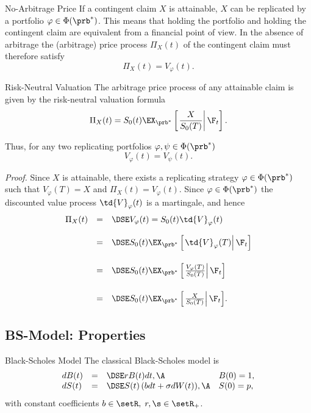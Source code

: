 No-Arbitrage Price
	If a contingent claim $X$ is attainable, $X$ can be replicated by
	a portfolio $\varphi \in \Phi(\prb^*)$. This means that holding
	the portfolio and holding the contingent claim are equivalent from
	a financial point of view. In the absence of arbitrage the
	(arbitrage) price process $\Pi_X(t)$ of the contingent claim must
	therefore satisfy
		$$
		\Pi_X(t) = V_\varphi(t).
		$$


Risk-Neutral Valuation
	The arbitrage price process of
	any attainable claim is given by the risk-neutral valuation
	formula
		$$
		\Pi_X(t) = S_0(t)
		\EX_{\prb^*}\left[\left.\frac{X}{S_0(T)}\right|\F_t\right].
		$$

	Thus, for any two replicating portfolios $\varphi, \psi \in
	\Phi(\prb^*)$
		$$
		V_\varphi(t) = V_\psi(t).
		$$

	{\it Proof.} Since $X$ is
	attainable, there exists a replicating strategy $\varphi \in
	\Phi(\prb^*)$ such that $V_\varphi(T) = X$ and $\Pi_X(t) =
	V_\varphi(t)$. Since $\varphi \in \Phi(\prb^*)$ the discounted
	value process $\td{V}_\varphi(t)$ is a martingale, and hence
		$$
		\begin{array}{lll}
		\Pi_X(t) &=&\DSE V_\varphi(t) = S_0(t)\td{V}_\varphi(t) \\*[12pt]
		&=&\DSE S_0(t) \EX_{\prb^*}
		\left[\left.\td{V}_\varphi(T)\right|\F_t\right]\\*[18pt]
		&=&\DSE S_0(t)
		\EX_{\prb^*}
		\left[\left.\frac{V_\varphi(T)}{S_0(T)}\right|\F_t\right]\\*[18pt]
		&=&\DSE S_0(t) \EX_{\prb^*}
		\left[\left.\frac{X}{S_0(T)}\right|\F_t\right]\!.
		\end{array}
		$$
	\hfill \eb


\subsection{BS-Model: Properties}

Black-Scholes Model
	The classical Black-Scholes model is
		$$
		\begin{array}{llll}
		dB(t) &=&\DSE r B(t) dt, \A &B(0)= 1,\\ dS(t) &=&\DSE S(t) \left(
		b dt + \sigma dW(t) \right)\!, \A &S(0) = p,
		\end{array}
		$$
	with constant coefficients $b \in \setR,\; r,\s \in \setR_+$.

